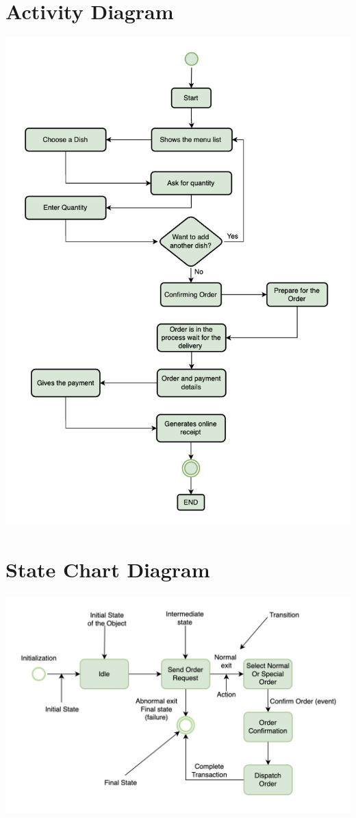\documentclass{article}
\begin{document}
\section{\textbf{Activity Diagram}}
\begin{center}
	\includegraphics[scale = 0.6]{Activity Diagram 2.png}
\end{center}
\section{\textbf{State Chart Diagram}}
\begin{center}
	\includegraphics[scale = 0.6]{StateChartDiagram.png}
\end{center}
\end{document}
